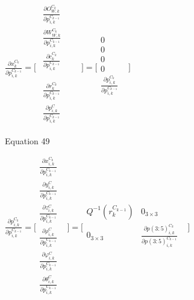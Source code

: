 $\frac{\partial x_{k}^{C_{k}}}{\partial p_{i,k}^{C_{k-1 }}}=\lbrack 
\begin{matrix}
\begin{matrix}
\frac{\partial O_{W,k}^{C_{k}}}{\partial p_{i,k}^{C_{k-1 }}} & \\
\frac{\partial W_{W,k}^{C_{k}}}{\partial p_{i,k}^{C_{k-1 }}} & \\
\frac{\partial c_{k}^{C_{k}}}{\partial p_{i,k}^{C_{k-1 }}} & \\
\end{matrix}
 & \\
\begin{matrix}
\frac{\partial r_{k}^{C_{k}}}{\partial p_{i,k}^{C_{k-1 }}} & \\
\frac{\partial p_{i, k}^{C}}{\partial p_{i,k}^{C_{k-1 }}} & \\
\end{matrix}
 & \\
\end{matrix}
\rbrack =\lbrack \begin{matrix}
0 & \\
0 & \\
0 & \\
0 & \\
\frac{\partial p_{i,k}^{C_{k }}}{\partial p_{i,k}^{C_{k-1 }}} & \\
\end{matrix}
\rbrack $\\


Equation 49

$\frac{\partial p_{i,k}^{C_{k }}}{\partial p_{i,k}^{C_{k-1 }}}=\lbrack 
\begin{matrix}
\frac{\partial x_{i,k}^{C_{k}}}{\partial p_{i,k}^{C_{k-1 }}} & \\
\frac{\partial y_{i,k}^{C}}{\partial p_{i,k}^{C_{k-1 }}} & \\
\frac{\partial z_{i,k}^{C}}{\partial p_{i,k}^{C_{k-1 }}} & \\
\frac{\partial \rho _{i,k}^{C}}{\partial p_{i,k}^{C_{k-1 }}} & \\
\frac{\partial \varphi _{i, k}^{C}}{\partial p_{i,k}^{C_{k-1 }}} & \\
\frac{\partial \theta _{i, k}^{C}}{\partial p_{i,k}^{C_{k-1 }}} & \\
\end{matrix}
\rbrack =\lbrack \begin{matrix}
Q^{-1}(r_{k}^{C_{k-1}}) & 0_{3\times 3} & \\
0_{3\times 3} & \frac{\partial p(3:5)_{i,k}^{C_{k}}}{\partial 
p(3:5)_{i,k}^{C_{k-1}}} & \\
\end{matrix}
\rbrack $\\


